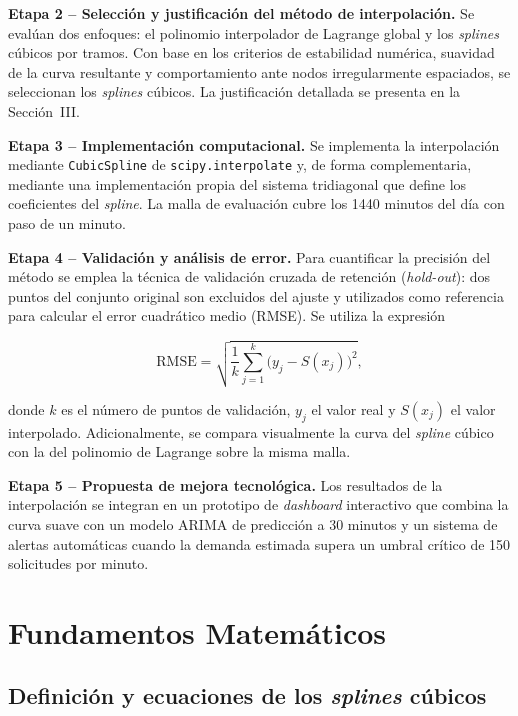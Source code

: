 \documentclass[conference]{IEEEtran}
\begin{document}
\textbf{Etapa 2 – Selección y justificación del método de interpolación.} Se evalúan dos enfoques: el polinomio interpolador de Lagrange global y los
\textit{splines} cúbicos por tramos. Con base en los criterios de estabilidad numérica, suavidad de la curva resultante y comportamiento ante nodos
irregularmente espaciados, se seleccionan los \textit{splines} cúbicos. La justificación detallada se presenta en la Sección~III.

\textbf{Etapa 3 – Implementación computacional.} Se implementa la interpolación mediante \texttt{CubicSpline} de \texttt{scipy.interpolate} y, de forma
complementaria, mediante una implementación propia del sistema tridiagonal que define los coeficientes del \textit{spline}. La malla de evaluación cubre
los 1440 minutos del día con paso de un minuto.

\textbf{Etapa 4 – Validación y análisis de error.} Para cuantificar la precisión del método se emplea la técnica de validación cruzada de retención
(\textit{hold-out}): dos puntos del conjunto original son excluidos del ajuste y utilizados como referencia para calcular el error cuadrático medio
(RMSE). Se utiliza la expresión

\begin{equation}
\mathrm{RMSE} = \sqrt{\frac{1}{k}\sum_{j=1}^{k}
    \bigl(y_j - S(x_j)\bigr)^2},
\label{eq:rmse}
\end{equation}

\noindent donde $k$ es el número de puntos de validación, $y_j$ el valor real y $S(x_j)$ el valor interpolado. Adicionalmente, se compara visualmente la
curva del \textit{spline} cúbico con la del polinomio de Lagrange sobre la misma malla.

\textbf{Etapa 5 – Propuesta de mejora tecnológica.} Los resultados de la interpolación se integran en un prototipo de \textit{dashboard} interactivo que
combina la curva suave con un modelo ARIMA de predicción a 30 minutos y un sistema de alertas automáticas cuando la demanda estimada supera un umbral
crítico de 150 solicitudes por minuto.

\section{Fundamentos Matemáticos}

\subsection{Definición y ecuaciones de los \textit{splines} cúbicos}
\end{document}

